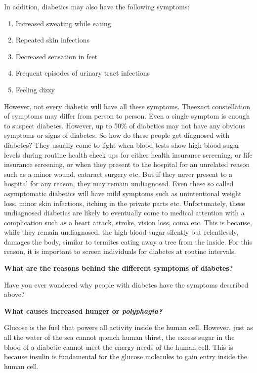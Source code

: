 In addition, diabetics may also have the following symptoms:

\begin{enumerate}[\ding{226}]
\itemsep=0pt
\item Increased sweating while eating
\item Repeated skin infections
\item Decreased sensation in feet
\item Frequent episodes of urinary tract infections
\item Feeling dizzy
 \end{enumerate}

However, not every diabetic will have all these symptoms. The\break exact constellation of symptoms may differ from person to person. Even a single symptom is enough to suspect diabetes. However, up to 50\% of diabetics may not have any obvious symptoms or signs of diabetes. So how do these people get diagnosed with diabetes? They usually come to light when blood tests show high blood sugar levels during routine health check ups for either health insurance scree\-ning, or life insurance screening, or when they present to the hospital for an un\-related reason such as a minor wound, cataract surgery etc. But if they never present to a hospital for any reason, they may remain undia\-gnosed. Even these so called asymptomatic diabetics will have mild symptoms such as unintentional weight loss, minor skin infe\-ctions, itching in the private parts etc. Unfortunately, these undiagnosed dia\-betics are likely to eventually come to medical attention with a compli\-cation such as a heart attack, stroke, vision loss, coma etc. This is because, while they remain undiagnosed, the high blood sugar silently but relentlessly, damages the body, similar to termites eating away a tree from the inside. For this reason, it is important to screen indi\-viduals for diabetes at routine intervals.

\noindent
\textbf{What are the reasons behind the different symptoms of diabetes?}

Have you ever wondered why people with diabetes have the symptoms described above?

\noindent
\textbf{What causes increased hunger or \textit{polyphagia?}}

Glucose is the fuel that powers all activity inside the human cell. However, just as all the water of the sea cannot quench human thirst, the excess sugar in the blood of a diabetic cannot meet the energy needs of the human cell. This is because insulin is fundamental for the glucose molecules to gain entry inside the human cell.

